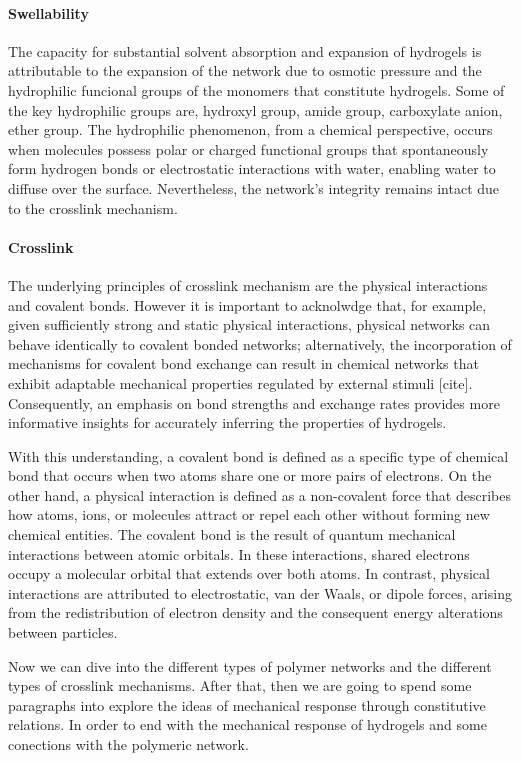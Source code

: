 \paragraph{Swellability} The capacity for substantial solvent absorption and expansion of hydrogels is attributable to the expansion of the network due to osmotic pressure and the hydrophilic funcional groups of the monomers that constitute hydrogels.
Some of the key hydrophilic groups are,
    hydroxyl group,
    amide group,
    carboxylate anion,
    ether group.
The hydrophilic phenomenon, from a chemical perspective, occurs when molecules possess polar or charged functional groups that spontaneously form hydrogen bonds or electrostatic interactions with water, enabling water to diffuse over the surface.
Nevertheless, the network's integrity remains intact due to the crosslink mechanism.

\paragraph{Crosslink} The underlying principles of crosslink mechanism are the physical interactions and covalent bonds.
However it is important to acknolwdge that, for example, given sufficiently strong and static physical interactions, physical networks can behave identically to covalent bonded networks; 
alternatively, the incorporation of mechanisms for covalent bond exchange can result in chemical networks that exhibit adaptable mechanical properties regulated by external stimuli [cite]. 
Consequently, an emphasis on bond strengths and exchange rates provides more informative insights for accurately inferring the properties of hydrogels.

With this understanding, a covalent bond is defined as a specific type of chemical bond that occurs when two atoms share one or more pairs of electrons. 
On the other hand, a physical interaction is defined as a non-covalent force that describes how atoms, ions, or molecules attract or repel each other without forming new chemical entities. 
The covalent bond is the result of quantum mechanical interactions between atomic orbitals.
In these interactions, shared electrons occupy a molecular orbital that extends over both atoms. 
In contrast, physical interactions are attributed to electrostatic, van der Waals, or dipole forces, arising from the redistribution of electron density and the consequent energy alterations between particles.

Now we can dive into the different types of polymer networks and the different types of crosslink mechanisms.
After that, then we are going to spend some paragraphs into explore the ideas of mechanical response through constitutive relations.
In order to end with the mechanical response of hydrogels and some conections with the polymeric network.


